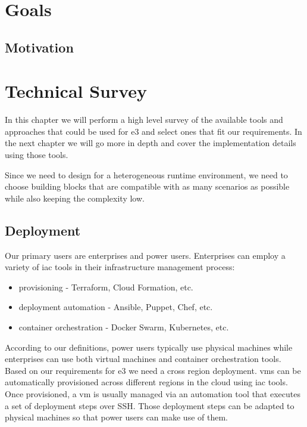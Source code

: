 \documentclass[
]{article}
\providecommand{\tightlist}{%
  \setlength{\itemsep}{0pt}\setlength{\parskip}{0pt}}
\begin{document}
\hypertarget{goals}{%
  \section{Goals}\label{goals}}

\hypertarget{motivation}{%
  \subsection{Motivation}\label{motivation}}

\hypertarget{technical-survey}{%
  \section{Technical Survey}\label{technical-survey}}

In this chapter we will perform a high level survey of the available
tools and approaches that could be used for \gls{e3} and select ones
that fit our requirements. In the next chapter we will go more in depth
and cover the implementation details using those tools.

Since we need to design for a heterogeneous runtime environment, we need
to choose building blocks that are compatible with as many scenarios as
possible while also keeping the complexity low.

\hypertarget{deployment}{%
  \subsection{Deployment}\label{deployment}}

Our primary users are enterprises and power users. Enterprises can
employ a variety of \gls{iac} tools in their infrastructure management
process:

\begin{itemize}
  \tightlist
  \item
        provisioning - Terraform\autocite{tfDocs}, Cloud
        Formation\autocite{cfDocs}, etc.
  \item
        deployment automation - Ansible\autocite{ansibleDocs},
        Puppet\autocite{puppetDocs}, Chef\autocite{chefDocs}, etc.
  \item
        container orchestration - Docker Swarm\autocite{dockerDocs},
        Kubernetes\autocite{kubeDocs}, etc.
\end{itemize}

According to our definitions, power users typically use physical
machines while enterprises can use both virtual machines and container
orchestration tools. Based on our requirements for \gls{e3} we need a
cross region deployment. \glspl{vm} can be automatically provisioned
across different regions in the cloud using \gls{iac} tools. Once
provisioned, a \gls{vm} is usually managed via an automation tool that
executes a set of deployment steps over SSH. Those deployment steps can
be adapted to physical machines so that power users can make use of
them.
\end{document}
